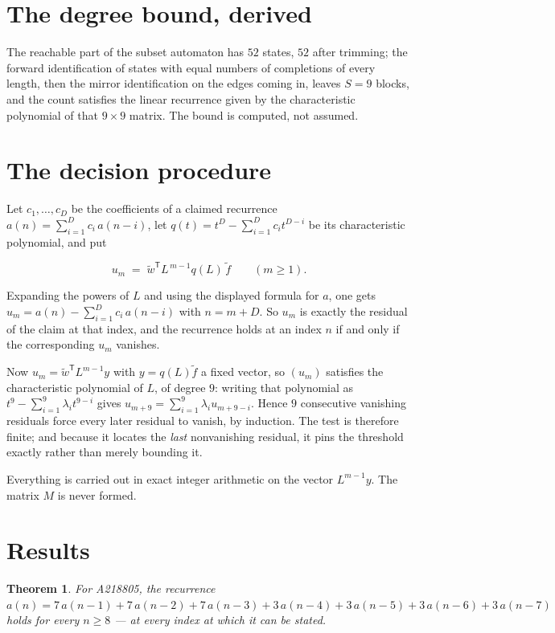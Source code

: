 \documentclass[11pt]{article}
\newtheorem{theorem}{Theorem}
\theoremstyle{definition}
\begin{document}
\section{The degree bound, derived}

The reachable part of the subset automaton has $52$ states, $52$ after trimming; the forward identification of states with equal numbers of completions of every length, then the mirror identification on the edges coming in, leaves $S = 9$ blocks, and the count satisfies the linear recurrence given by the characteristic polynomial of that $9\times9$ matrix. The bound is computed, not assumed.

\section{The decision procedure}

Let $c_1,\dots,c_D$ be the coefficients of a claimed recurrence $a(n) = \sum_{i=1}^{D} c_i\,a(n-i)$, let $q(t) = t^{D} - \sum_{i=1}^{D} c_i t^{D-i}$ be its characteristic polynomial, and put

\[u_m \;=\; \tilde w^{\mathsf T} L^{\,m-1} q(L)\,\tilde f \qquad (m \ge 1).\]

Expanding the powers of $L$ and using the displayed formula for $a$, one gets $u_m = a(n) - \sum_{i=1}^{D} c_i\,a(n-i)$ with $n = m + D$. So $u_m$ is exactly the residual of the claim at that index, and the recurrence holds at an index $n$ if and only if the corresponding $u_m$ vanishes.

Now $u_m = \tilde w^{\mathsf T} L^{m-1} y$ with $y = q(L)\tilde f$ a fixed vector, so $(u_m)$ satisfies the characteristic polynomial of $L$, of degree $9$: writing that polynomial as $t^{9} - \sum_{i=1}^{9} \lambda_i t^{9-i}$ gives $u_{m+9} = \sum_{i=1}^{9} \lambda_i u_{m+9-i}$. Hence $9$ consecutive vanishing residuals force every later residual to vanish, by induction. The test is therefore finite; and because it locates the {\itshape last} nonvanishing residual, it pins the threshold exactly rather than merely bounding it.

Everything is carried out in exact integer arithmetic on the vector $L^{m-1}y$. The matrix $M$ is never formed.

\section{Results}

\begin{theorem} For A218805, the recurrence $a(n) = 7\,a(n-1) + 7\,a(n-2) + 7\,a(n-3) + 3\,a(n-4) + 3\,a(n-5) + 3\,a(n-6) + 3\,a(n-7)$ holds for every $n \ge 8$ --- at every index at which it can be stated.\end{theorem}
\end{document}
